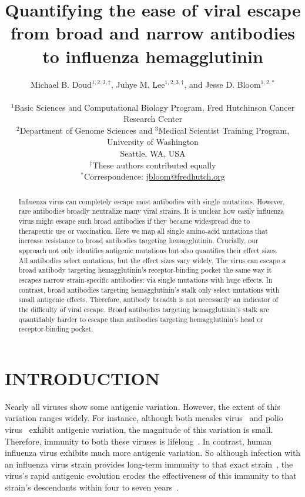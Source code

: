 \documentclass[11pt]{article}
\title{Quantifying the ease of viral escape from broad and narrow antibodies to influenza hemagglutinin}
\author
{Michael B. Doud$^{1,2,3,\dagger}$, Juhye M. Lee$^{1,2,3,\dagger}$, and Jesse D. Bloom$^{1,2,*}$\\
\\
\scriptsize{$^1$Basic Sciences and Computational Biology Program, Fred Hutchinson Cancer Research Center}\\
\scriptsize{$^2$Department of Genome Sciences and $^3$Medical Scientist Training Program, University of Washington} \\
\scriptsize{Seattle, WA, USA} \\
\scriptsize{$^{\dagger}$These authors contributed equally} \\
\scriptsize{$^*$Correspondence: \href{jbloom@fredhutch.org}{jbloom@fredhutch.org}}
}
\date{}
\begin{document}
\maketitle
\onehalfspacing

\begin{abstract}
Influenza virus can completely escape most antibodies with single mutations.
However, rare antibodies broadly neutralize many viral strains.
It is unclear how easily influenza virus might escape such broad antibodies if they became widespread due to therapeutic use or vaccination.
Here we map all single amino-acid mutations that increase resistance to broad antibodies targeting hemagglutinin.
Crucially, our approach not only identifies antigenic mutations but also quantifies their effect sizes.
All antibodies select mutations, but the effect sizes vary widely. 
The virus can escape a broad antibody targeting hemagglutinin's receptor-binding pocket the same way it escapes narrow strain-specific antibodies: via single mutations with huge effects.   
In contrast, broad antibodies targeting hemagglutinin's stalk only select mutations with small antigenic effects. 
Therefore, antibody breadth is not necessarily an indicator of the difficulty of viral escape.
Broad antibodies targeting hemagglutinin's stalk are quantifiably harder to escape than antibodies targeting hemagglutinin's head or receptor-binding pocket.
\end{abstract}

\section*{INTRODUCTION}
Nearly all viruses show some antigenic variation.
However, the extent of this variation ranges widely.
For instance, although both measles virus~\citep{birrer1981antigenic,ter1981antigenic} and polio virus~\citep{crainic1983natural,diamond1985antigenic,drexler2014robustness} exhibit antigenic variation, the magnitude of this variation is small. 
Therefore, immunity to both these viruses is lifelong~\citep{panum1847iagttagelser,salk1984one}.
In contrast, human influenza virus exhibits much more antigenic variation.
So although infection with an influenza virus strain provides long-term immunity to that exact strain~\citep{davies1982christ,yu2008neutralizing}, the virus's rapid antigenic evolution erodes the effectiveness of this immunity to that strain's descendants within four to seven years~\citep{couch1983immunity}.
\end{document}
